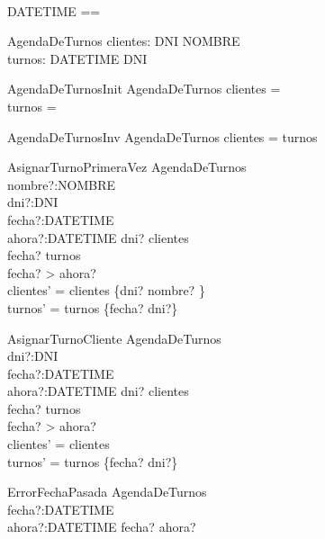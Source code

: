 \begin{zed}
 \\
DATETIME == \nat
\end{zed}

\begin{schema}{AgendaDeTurnos}
clientes: DNI \pfun NOMBRE \\
turnos: DATETIME \pfun DNI
\end{schema}

\begin{schema}{AgendaDeTurnosInit}
AgendaDeTurnos
\where
clientes = \emptyset \\
turnos = \emptyset
\end{schema}

\begin{schema}{AgendaDeTurnosInv}
AgendaDeTurnos
\where
\dom clientes = \ran turnos
\end{schema}

\begin{schema}{AsignarTurnoPrimeraVez}
\Delta AgendaDeTurnos \\
nombre?:NOMBRE \\
dni?:DNI \\
fecha?:DATETIME \\
ahora?:DATETIME
\where
dni? \notin \dom clientes \\
fecha? \notin \dom turnos \\
fecha? > ahora? \\
clientes' = clientes \cup \{dni? \mapsto nombre? \} \\
turnos' = turnos \cup \{fecha? \mapsto dni?\}
\end{schema}

\begin{schema}{AsignarTurnoCliente}
\Delta AgendaDeTurnos \\
dni?:DNI \\
fecha?:DATETIME \\
ahora?:DATETIME
\where
dni? \in \dom clientes \\
fecha? \notin \dom turnos \\
fecha? > ahora? \\
clientes' = clientes \\
turnos' = turnos \cup \{fecha? \mapsto dni?\}
\end{schema}

\begin{schema}{ErrorFechaPasada}
\Xi AgendaDeTurnos \\
fecha?:DATETIME \\
ahora?:DATETIME
\where
fecha? \leq ahora?
\end{schema}

